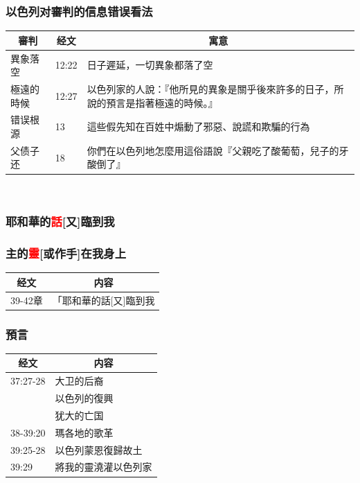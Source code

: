 \subsubsection{以色列对審判的信息错误看法}
\begin{table}[H]
\centering
\begin{tabular}{p{3.75cm}|p{2.0cm}|p{11.0cm}}\hline\hline
\multicolumn{1}{c|}{審判}&\multicolumn{1}{c|}{经文}&\multicolumn{1}{c}{寓意}\\\hline
異象落空&12:22&日子遲延，一切異象都落了空\\\hline 
極遠的時候&12:27&以色列家的人說：『他所見的異象是關乎後來許多的日子，所說的預言是指著極遠的時候。』\\\hline 
错误根源&13&這些假先知在百姓中煽動了邪惡、說謊和欺騙的行為\\\hline 
父债子还&18&你們在以色列地怎麼用這俗語說『父親吃了酸葡萄，兒子的牙酸倒了』\\\hline 
\end{tabular}
\end{table}
　　
\subsubsection{耶和華的\textcolor{red}{話}[又]臨到我}

\subsubsection{主的\textcolor{red}{靈}[或作手]在我身上}
\begin{table}[H]
\centering
\begin{tabular}{p{}|p{12.50cm}}\hline\hline
\multicolumn{1}{c|}{经文}&\multicolumn{1}{c}{内容}\\\hline
39-42章&「耶和華的話[又]臨到我\\\hline
\end{tabular}
\end{table}

\subsubsection{預言}
\begin{table}[H]
\centering
\begin{tabular}{p{}|p{12.50cm}}\hline\hline
\multicolumn{1}{c|}{经文}&\multicolumn{1}{c}{内容}\\\hline
37:27-28&大卫的后裔\\\hline
&以色列的復興\\\hline
&犹大的亡国\\\hline
38-39:20&瑪各地的歌革\\\hline
39:25-28&以色列蒙恩復歸故土\\\hline
39:29&將我的靈澆灌以色列家\\\hline
\end{tabular}
\end{table}



